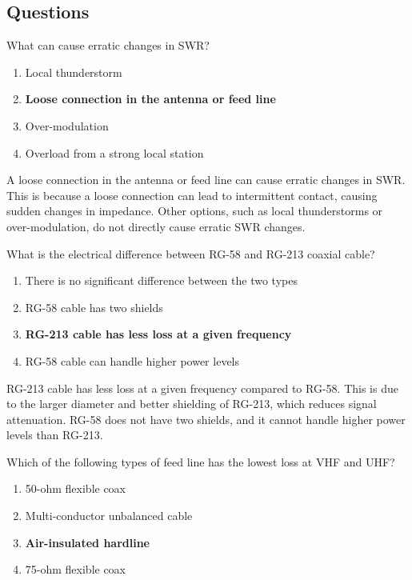 \subsection*{Questions}

\begin{tcolorbox}[colback=gray!10!white,colframe=black!75!black,title={T9B09}]
What can cause erratic changes in SWR?
\begin{enumerate}[label=\Alph*),noitemsep]
    \item Local thunderstorm
    \item \textbf{Loose connection in the antenna or feed line}
    \item Over-modulation
    \item Overload from a strong local station
\end{enumerate}
\end{tcolorbox}

A loose connection in the antenna or feed line can cause erratic changes in SWR. This is because a loose connection can lead to intermittent contact, causing sudden changes in impedance. Other options, such as local thunderstorms or over-modulation, do not directly cause erratic SWR changes.


\begin{tcolorbox}[colback=gray!10!white,colframe=black!75!black,title={T9B10}]
What is the electrical difference between RG-58 and RG-213 coaxial cable?
\begin{enumerate}[label=\Alph*),noitemsep]
    \item There is no significant difference between the two types
    \item RG-58 cable has two shields
    \item \textbf{RG-213 cable has less loss at a given frequency}
    \item RG-58 cable can handle higher power levels
\end{enumerate}
\end{tcolorbox}

RG-213 cable has less loss at a given frequency compared to RG-58. This is due to the larger diameter and better shielding of RG-213, which reduces signal attenuation. RG-58 does not have two shields, and it cannot handle higher power levels than RG-213.


\begin{tcolorbox}[colback=gray!10!white,colframe=black!75!black,title={T9B11}]
Which of the following types of feed line has the lowest loss at VHF and UHF?
\begin{enumerate}[label=\Alph*),noitemsep]
    \item 50-ohm flexible coax
    \item Multi-conductor unbalanced cable
    \item \textbf{Air-insulated hardline}
    \item 75-ohm flexible coax
\end{enumerate}
\end{tcolorbox}

